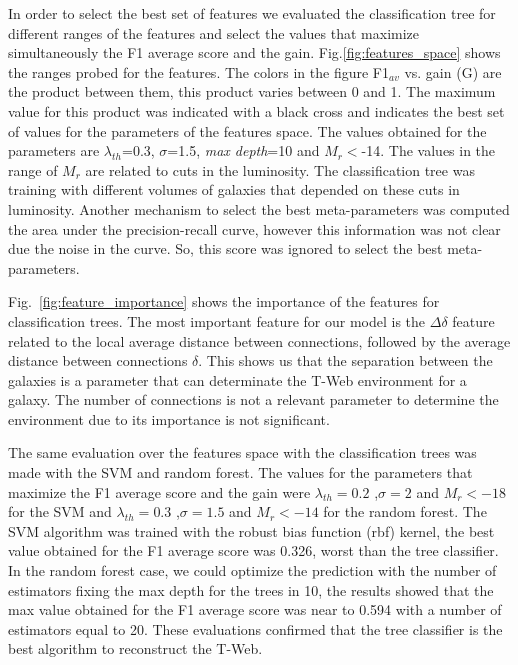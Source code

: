 \documentclass[usenatbib]{mnras}
\begin{document}
In order to select the best set of features we evaluated the classification tree for different ranges of the features and select the values that maximize simultaneously the F1 average score and the gain. Fig.\ref{fig:features_space} shows the ranges probed for the features. 
The colors in the figure F1$_{av}$ vs. gain (G) are the product between them, this product varies between 0 and 1. 
The maximum value for this product was indicated with a black cross and indicates the best set of values for the parameters of the features space. 
The values obtained for the parameters are $\lambda_{th}$=0.3, $\sigma$=1.5, \textit{max depth}=10 and $M_r<$-14.
The values in the range of $M_r$ are related to cuts in the luminosity. The classification tree was training with different volumes of galaxies that depended on these cuts in luminosity. Another mechanism to select the best meta-parameters was computed the area under the precision-recall curve, however this information was not clear due the noise in the curve. So, this score was ignored to select the best meta-parameters.

Fig.~\ref{fig:feature_importance} shows the importance of the features for classification trees. The most important feature for our model is the $\Delta \delta$ feature related to the local average distance between connections, followed by the average distance between connections $\delta$. This shows us that the separation between the galaxies is a parameter that can determinate the T-Web environment for a galaxy. The number of connections is not a relevant parameter to determine the environment due to its importance is not significant.

The same evaluation over the features space with the classification trees was made with the SVM and random forest. The values for the parameters that maximize the F1 average score and the gain were $\lambda_{th}=0.2$ ,$\sigma=2$ and $M_{r}<-18$ for the SVM and $\lambda_{th}=0.3$ ,$\sigma=1.5$ and $M_{r}<-14$ for the random forest. The SVM algorithm was trained with the robust bias function (rbf) kernel, the best value obtained for the F1 average score was 0.326, worst than the tree classifier. In the random forest case, we could optimize the prediction with the number of estimators fixing the max depth for the trees in 10, the results showed that the max value obtained for the F1 average score was near to 0.594 with a number of estimators equal to 20. These evaluations confirmed that the tree classifier is the best algorithm to reconstruct the T-Web.
\end{document}
